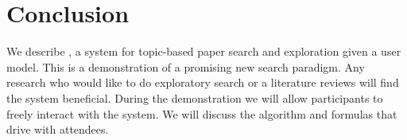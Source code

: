 \section{Conclusion}

We describe \system, a system for topic-based paper search
and exploration given a user model.
This is a demonstration of a promising new search paradigm.
Any research who would like to do exploratory search or a literature 
reviews will find the system beneficial.
During the demonstration we will allow participants to freely
interact with the system.
We will discuss the algorithm and formulas that drive \system with attendees.
